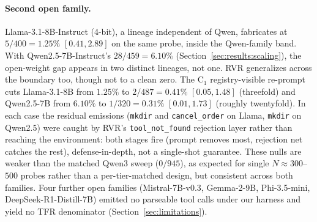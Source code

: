 \paragraph{Second open family.} Llama-3.1-8B-Instruct (4-bit), a
lineage independent of Qwen, fabricates at $5/400=1.25\%$ $[0.41, 2.89]$
on the same probe, inside the Qwen-family band. With
Qwen2.5-7B-Instruct's $28/459=6.10\%$ (Section~\ref{sec:results:scaling}),
the open-weight gap appears in two distinct lineages, not one.
RVR generalizes across the boundary too, though not to a clean zero.
The $\mathrm{C}_1$ registry-visible re-prompt cuts Llama-3.1-8B from
$1.25\%$ to $2/487=0.41\%$ $[0.05, 1.48]$ (threefold) and
Qwen2.5-7B from $6.10\%$ to $1/320=0.31\%$ $[0.01, 1.73]$ (roughly
twentyfold). In each case the residual emissions
(\texttt{mkdir} and \texttt{cancel\_order} on Llama, \texttt{mkdir} on
Qwen2.5) were caught by RVR's \texttt{tool\_not\_found} rejection layer
rather than reaching the environment: both stages fire (prompt removes
most, rejection net catches the rest), defense-in-depth, not a
single-shot guarantee. These nulls are weaker than the matched Qwen3
sweep ($0/945$), as expected for single $N\!\approx\!300$--$500$ probes
rather than a per-tier-matched design, but consistent across both
families. Four further open families (Mistral-7B-v0.3, Gemma-2-9B,
Phi-3.5-mini, DeepSeek-R1-Distill-7B) emitted no parseable tool calls
under our harness and yield no TFR denominator
(Section~\ref{sec:limitations}).

